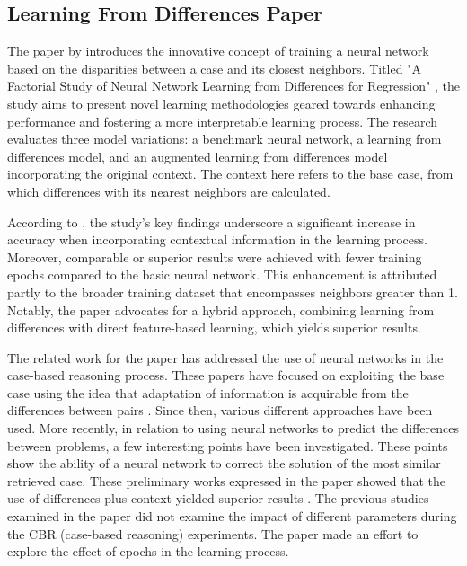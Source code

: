 \documentclass[a4paper, 12pt]{report}
\begin{document}
\subsection{Learning From Differences Paper}

The paper by \cite{learningFromDifferences2022} introduces the innovative concept of training a neural network based on the disparities between a case and its closest neighbors.
Titled "A Factorial Study of Neural Network Learning from Differences for Regression" \cite{learningFromDifferences2022}, the study aims to present novel learning methodologies geared
towards enhancing performance and fostering a more interpretable learning process. The research evaluates three model variations: a benchmark neural network, a learning from differences model,
and an augmented learning from differences model incorporating the original context. The context here refers to the base case, from which differences with its nearest neighbors are calculated.

According to \cite{learningFromDifferences2022}, the study's key findings underscore a significant increase in accuracy when incorporating contextual information in the learning process.
Moreover, comparable or superior results were achieved with fewer training epochs compared to the basic neural network.
This enhancement is attributed partly to the broader training dataset that encompasses neighbors greater than 1.
Notably, the paper advocates for a hybrid approach, combining learning from differences with direct feature-based learning, which yields superior results.

The related work for the paper \cite{learningFromDifferences2022} has addressed the use of neural networks in the case-based reasoning process.
These papers have focused on exploiting the base case using the idea that adaptation of information is acquirable from the differences between pairs \cite{hanney1996learning}.
Since then, various different approaches have been used. More recently, in relation to using neural networks to predict the differences between problems, a few interesting points have been investigated.
These points show the ability of a neural network to correct the solution of the most similar retrieved case. These preliminary works expressed in the paper showed that the use of differences plus context
yielded superior results \cite{craw2006learning}. The previous studies examined in the paper \cite{learningFromDifferences2022} did not examine the impact of different parameters during the CBR (case-based reasoning) experiments.
The paper \cite{learningFromDifferences2022} made an effort to explore the effect of epochs in the learning process.
\end{document}

